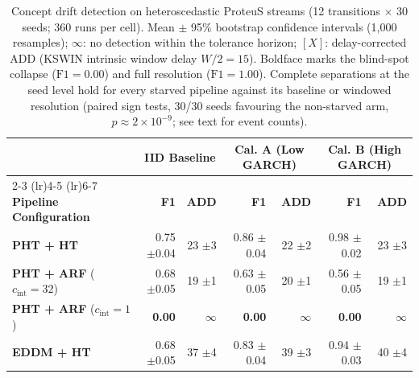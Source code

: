 \begin{table}[t]
  \centering
  \caption{Concept drift detection on heteroscedastic ProteuS streams (12 transitions $\times$ 30 seeds; 360 runs per cell). Mean $\pm$ 95\% bootstrap confidence intervals (1,000 resamples); $\infty$: no detection within the tolerance horizon; $[X]$: delay-corrected ADD (KSWIN intrinsic window delay $W/2 = 15$). Boldface marks the blind-spot collapse ($\mathrm{F1}=0.00$) and full resolution ($\mathrm{F1}=1.00$). Complete separations at the seed level hold for every starved pipeline against its baseline or windowed resolution (paired sign tests, 30/30 seeds favouring the non-starved arm, $p \approx 2\times10^{-9}$; see text for event counts).}
  \label{tab:results_concept}
  \begin{tabular}{@{}lrrrrrr@{}}
    \toprule
                                                   & \multicolumn{2}{c}{\textbf{IID Baseline}} & \multicolumn{2}{c}{\textbf{Cal. A (Low GARCH)}} & \multicolumn{2}{c}{\textbf{Cal. B (High GARCH)}}                                                                     \\
    \cmidrule(lr){2-3} \cmidrule(lr){4-5} \cmidrule(lr){6-7}
    \textbf{Pipeline Configuration}                & \textbf{F1}                               & \textbf{ADD}                                    & \textbf{F1}                                      & \textbf{ADD}       & \textbf{F1}             & \textbf{ADD}       \\
    \midrule
    \textbf{PHT + HT}                              & 0.75 {\small $\pm$0.04}                   & 23 {\small $\pm$3}                              & 0.86 {\small $\pm$0.04}                          & 22 {\small $\pm$2} & 0.98 {\small $\pm$0.02} & 23 {\small $\pm$3} \\
    \textbf{PHT + ARF} ($c_{\mathrm{int}} = 32$)   & 0.68 {\small $\pm$0.05}                   & 19 {\small $\pm$1}                              & 0.63 {\small $\pm$0.05}                          & 20 {\small $\pm$1} & 0.56 {\small $\pm$0.05} & 19 {\small $\pm$1} \\
    \textbf{PHT + ARF} ($c_{\mathrm{int}} = 1$)    & \textbf{0.00}                             & $\infty$                                        & \textbf{0.00}                                    & $\infty$           & \textbf{0.00}           & $\infty$           \\
    \midrule
    \textbf{EDDM + HT}                             & 0.68 {\small $\pm$0.05}                   & 37 {\small $\pm$4}                              & 0.83 {\small $\pm$0.04}                          & 39 {\small $\pm$3} & 0.94 {\small $\pm$0.03} & 40 {\small $\pm$4} \\

\end{tabular}
\end{table}
